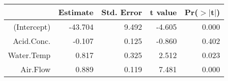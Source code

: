 \begin{table}[ht]
\centering
\begin{tabular}{rrrrr}
  \hline
 & Estimate & Std. Error & t value & Pr($>$$|$t$|$) \\ 
  \hline
(Intercept) & -43.704 & 9.492 & -4.605 & 0.000 \\ 
  Acid.Conc. & -0.107 & 0.125 & -0.860 & 0.402 \\ 
  Water.Temp & 0.817 & 0.325 & 2.512 & 0.023 \\ 
  Air.Flow & 0.889 & 0.119 & 7.481 & 0.000 \\ 
   \hline
\end{tabular}
\end{table}
